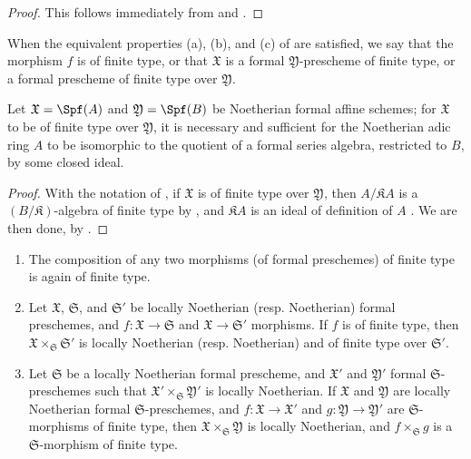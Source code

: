\begin{proof}
This follows immediately from  and .
\end{proof}

\begin{definition}[10.13.3]
\label{I.10.13.3}
When the equivalent properties (a), (b), and (c) of  are satisfied, we say that the morphism $f$ is of finite type, or that $\mathfrak{X}$ is a formal $\mathfrak{Y}$-prescheme of finite type, or a formal prescheme of finite type over $\mathfrak{Y}$.
\end{definition}

\begin{corollary}[10.13.4]
\label{I.10.13.4}
Let $\mathfrak{X}=\Spf(A)$ and $\mathfrak{Y}=\Spf(B)$ be Noetherian formal affine schemes;
for $\mathfrak{X}$ to be of finite type over $\mathfrak{Y}$, it is necessary and sufficient for the Noetherian adic ring $A$ to be isomorphic to the quotient of a formal series algebra, restricted to $B$, by some closed ideal.
\end{corollary}

\begin{proof}
With the notation of , if $\mathfrak{X}$ is of finite type over $\mathfrak{Y}$, then $A/\mathfrak{K}A$ is a $(B/\mathfrak{K})$-algebra of finite type by , and $\mathfrak{K}A$ is an ideal of definition of $A$ .
We are then done, by .
\end{proof}

\begin{proposition}[10.13.5]
\label{I.10.13.5}
\medskip\noindent
\begin{enumerate}
  \item[\rm{(i)}] The composition of any two morphisms (of formal preschemes) of finite type is again of finite type.
  \item[\rm{(ii)}] Let $\mathfrak{X}$, $\mathfrak{S}$, and $\mathfrak{S}'$ be locally Noetherian (resp. Noetherian) formal preschemes, and $f:\mathfrak{X}\to\mathfrak{S}$ and $\mathfrak{X}\to\mathfrak{S}'$ morphisms.
    If $f$ is of finite type, then $\mathfrak{X}\times_\mathfrak{S}\mathfrak{S}'$ is locally Noetherian (resp. Noetherian) and of finite type over $\mathfrak{S}'$.
  \item[\rm{(iii)}] Let $\mathfrak{S}$ be a locally Noetherian formal prescheme, and $\mathfrak{X}'$ and $\mathfrak{Y}'$ formal $\mathfrak{S}$-preschemes such that $\mathfrak{X}'\times_\mathfrak{S}\mathfrak{Y}'$ is locally Noetherian.
    If $\mathfrak{X}$ and $\mathfrak{Y}$ are locally Noetherian formal $\mathfrak{S}$-preschemes, and $f:\mathfrak{X}\to\mathfrak{X}'$ and $g:\mathfrak{Y}\to\mathfrak{Y}'$ are $\mathfrak{S}$-morphisms of finite type, then $\mathfrak{X}\times_\mathfrak{S}\mathfrak{Y}$ is locally Noetherian, and $f\times_\mathfrak{S}g$ is a $\mathfrak{S}$-morphism of finite type.
\end{enumerate}
\end{proposition}

